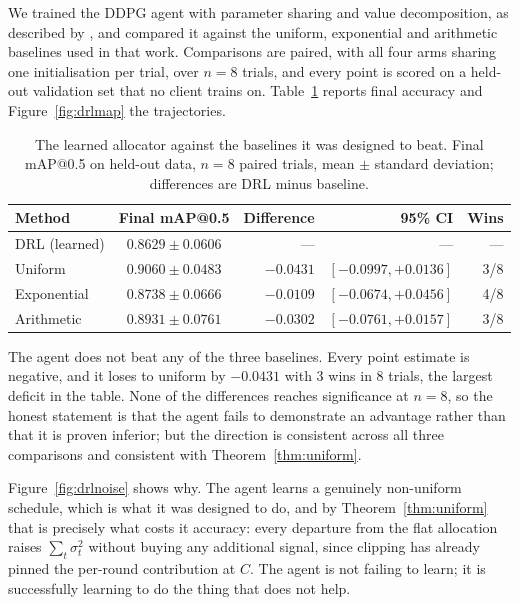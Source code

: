 \vspace{10pt}

We trained the DDPG agent with parameter sharing and value decomposition, as
described by \citeauthor{ChenAdaptivePrivacyMARL}
\cite{ChenAdaptivePrivacyMARL}, and compared it against the uniform, exponential
and arithmetic baselines used in that work. Comparisons are paired, with all
four arms sharing one initialisation per trial, over $n=8$ trials, and every
point is scored on a held-out validation set that no client trains on.
Table~\ref{tab:drl} reports final accuracy and Figure~\ref{fig:drlmap} the
trajectories.

\begin{table}[H]
\centering
\caption{The learned allocator against the baselines it was designed to beat.
Final mAP@0.5 on held-out data, $n=8$ paired trials, mean $\pm$ standard
deviation; differences are DRL minus baseline.}
\label{tab:drl}
\small
\begin{tabular}{lcrrr}
\toprule
Method & Final mAP@0.5 & Difference & 95\% CI & Wins \\
\midrule
DRL (learned) & $0.8629\pm0.0606$ & --- & --- & --- \\
Uniform & $0.9060\pm0.0483$ & $-0.0431$ & $[-0.0997,+0.0136]$ & 3/8 \\
Exponential & $0.8738\pm0.0666$ & $-0.0109$ & $[-0.0674,+0.0456]$ & 4/8 \\
Arithmetic & $0.8931\pm0.0761$ & $-0.0302$ & $[-0.0761,+0.0157]$ & 3/8 \\
\bottomrule
\end{tabular}
\end{table}

The agent does not beat any of the three baselines. Every point estimate is
negative, and it loses to uniform by $-0.0431$ with 3 wins in 8 trials, the
largest deficit in the table. None of the differences reaches significance at
$n=8$, so the honest statement is that the agent fails to demonstrate an
advantage rather than that it is proven inferior; but the direction is
consistent across all three comparisons and consistent with
Theorem~\ref{thm:uniform}.

\vspace{10pt}

Figure~\ref{fig:drlnoise} shows why. The agent learns a genuinely non-uniform
schedule, which is what it was designed to do, and by Theorem~\ref{thm:uniform}
that is precisely what costs it accuracy: every departure from the flat
allocation raises $\sum_t\sigma_t^2$ without buying any additional signal, since
clipping has already pinned the per-round contribution at $C$. The agent is not
failing to learn; it is successfully learning to do the thing that does not
help.

